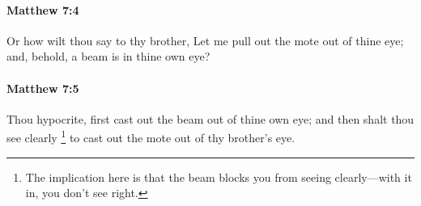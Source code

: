 		\paragraph{Matthew 7:4} %
			\label{MATTHEW-7-4}

			Or how wilt thou say to thy brother, Let me pull out the mote out of thine eye; and, behold, a beam is in thine own eye?

			\begin{framed}
			\scriptsize
				\begin{compactdesc}
					\item[SBLG] 
				\end{compactdesc}
			\end{framed}

		\paragraph{Matthew 7:5} %
			\label{MATTHEW-7-5}

			Thou hypocrite, first cast out the beam out of thine own eye; and then shalt thou see clearly%
				\footnote{%
					The implication here is that the beam blocks you from seeing clearly---with it in, you don't see right.
					} 
			to cast out the mote out of thy brother's eye.

